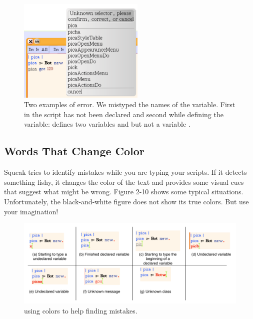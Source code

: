 \documentclass[a4paper,10pt,twoside]{book}
\begin{document}
\begin{figure}[h!]
\begin{center}\includegraphics[width=6cm]{periodMissing}
\caption{Two examples of error. We mistyped the names of the variable. First in the script  has not been declared and second while defining the variable:  defines two variables  and  but not a variable . \label{fig:periodMissing}}\end{center}
\end{figure}


\subsection{Words That Change Color }
Squeak tries to identify mistakes while you are typing your scripts. If it detects something 
fishy, it changes the color of the text and provides some visual cues that suggest what might be 
wrong. Figure 2-10 shows some typical situations. Unfortunately, the black-and-white figure 
does not show its true colors. But use your imagination! 

\begin{figure}[h!]
\begin{center}\includegraphics[width=12cm]{coloring}
\caption{\sq using colors to help finding mistakes. \label{fig:coloring}}\end{center}
\end{figure} 
\end{document}
